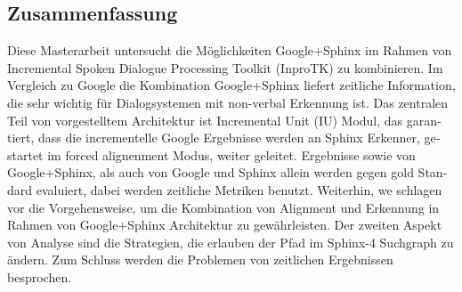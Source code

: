 
\begin{otherlanguage}{ngerman}
\section*{Zusammenfassung}
Diese Masterarbeit untersucht die Möglichkeiten Google+Sphinx im Rahmen von Incremental Spoken 
Dialogue Processing Toolkit (InproTK) zu kombinieren. Im Vergleich zu Google die Kombination Google+Sphinx 
liefert  zeitliche Information, die sehr wichtig für Dialogsystemen mit
non-verbal Erkennung ist.  Das zentralen Teil von vorgestelltem Architektur ist 
Incremental Unit (IU) Modul, das garantiert, dass die incrementelle Google
Ergebnisse werden an Sphinx Erkenner, gestartet  im forced alignenment Modus,
weiter geleitet. Ergebnisse sowie von Google+Sphinx, als auch von Google und
Sphinx allein werden gegen gold Standard evaluiert, dabei werden zeitliche
Metriken benutzt. Weiterhin, we schlagen vor die Vorgehensweise, um die Kombination von Alignment und Erkennung in Rahmen von Google+Sphinx Architektur zu gewährleisten. Der zweiten Aspekt von Analyse sind
die Strategien, die erlauben der Pfad im Sphinx-4 Suchgraph zu ändern. Zum
Schluss werden die Problemen von zeitlichen Ergebnissen besprochen.
\end{otherlanguage}